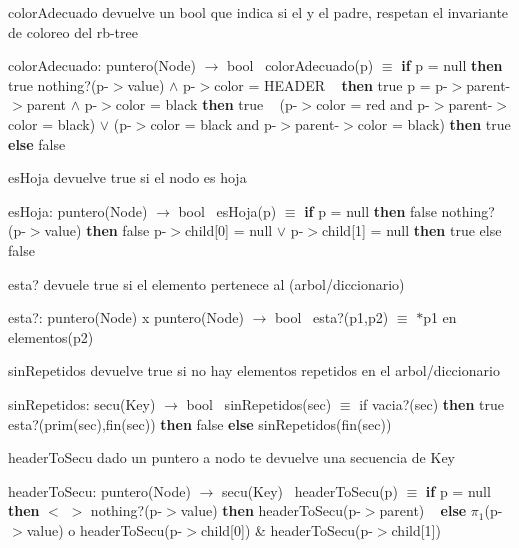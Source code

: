 \begin{DoxyParagraph}{color\+Adecuado}
devuelve un bool que indica si el y el padre, respetan el invariante de coloreo del rb-\/tree

color\+Adecuado\+: puntero(\+Node) $\to$ bool~\newline
 color\+Adecuado(p) $\equiv$ {\bfseries if} p = null {\bfseries then} true  nothing?(p-\/$>$value) $\land$ p-\/$>$color = H\+E\+A\+D\+ER ~\newline
 {\bfseries then} true  p = p-\/$>$parent-\/$>$parent $\land$ p-\/$>$color = black {\bfseries then} true ~\newline
  (p-\/$>$color = red and p-\/$>$parent-\/$>$color = black) $\lor$ (p-\/$>$color = black and p-\/$>$parent-\/$>$color = black) {\bfseries then} true {\bfseries else} false 
\end{DoxyParagraph}


\begin{DoxyParagraph}{es\+Hoja}
devuelve true si el nodo es hoja

es\+Hoja\+: puntero(\+Node) $\to$ bool~\newline
 es\+Hoja(p) $\equiv$ {\bfseries if} p = null {\bfseries then} false  nothing?(p-\/$>$value) {\bfseries then} false  p-\/$>$child\mbox{[}0\mbox{]} = null $\lor$ p-\/$>$child\mbox{[}1\mbox{]} = null {\bfseries then} true else false 
\end{DoxyParagraph}


\begin{DoxyParagraph}{esta?}
devuele true si el elemento pertenece al (arbol/diccionario)

esta?\+: puntero(\+Node) x puntero(\+Node) $\to$ bool~\newline
 esta?(p1,p2) $\equiv$ $\ast$p1 en elementos(p2) 
\end{DoxyParagraph}


\begin{DoxyParagraph}{sin\+Repetidos}
devuelve true si no hay elementos repetidos en el arbol/diccionario

sin\+Repetidos\+: secu(\+Key) $\to$ bool~\newline
 sin\+Repetidos(sec) $\equiv$ if vacia?(sec) {\bfseries then} true  esta?(prim(sec),fin(sec)) {\bfseries then} false {\bfseries else} sin\+Repetidos(fin(sec)) 
\end{DoxyParagraph}


\begin{DoxyParagraph}{header\+To\+Secu}
dado un puntero a nodo te devuelve una secuencia de Key

header\+To\+Secu\+: puntero(\+Node) $\to$ secu(\+Key)~\newline
 header\+To\+Secu(p) $\equiv$ {\bfseries if} p = null {\bfseries then} $<$ $>$  nothing?(p-\/$>$value) {\bfseries then} header\+To\+Secu(p-\/$>$parent) ~\newline
 {\bfseries else} $\pi_1$(p-\/$>$value) o header\+To\+Secu(p-\/$>$child\mbox{[}0\mbox{]}) \& header\+To\+Secu(p-\/$>$child\mbox{[}1\mbox{]}) 
\end{DoxyParagraph}


